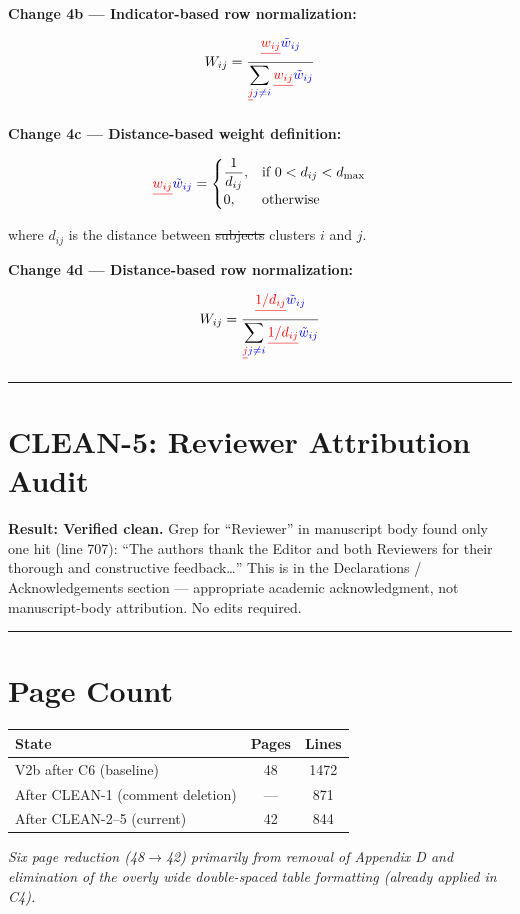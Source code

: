 \documentclass[11pt]{article}
\newcommand{\DEL}[1]{{\color{red}\sout{#1}}}
\newcommand{\ADD}[1]{{\color{blue}#1}}
\begin{document}
\medskip
\textbf{Change 4b --- Indicator-based row normalization:}

\cbstart
\[
  W_{ij} = \frac{\DEL{w_{ij}} \ADD{\tilde{w}_{ij}}}
                {\displaystyle\sum_{\DEL{j} \ADD{j \neq i}} \DEL{w_{ij}} \ADD{\tilde{w}_{ij}}}
\]
\cbend

\medskip
\textbf{Change 4c --- Distance-based weight definition:}

\cbstart
\[
  \DEL{w_{ij}} \ADD{\tilde{w}_{ij}} =
  \begin{cases}
    \dfrac{1}{d_{ij}}, & \text{if } 0 < d_{ij} < d_{\max}\\[4pt]
    0, & \text{otherwise}
  \end{cases}
\]
\cbend

\quad where $d_{ij}$ is the distance between \DEL{subjects} \ADD{clusters} $i$ and $j$.

\medskip
\textbf{Change 4d --- Distance-based row normalization:}

\cbstart
\[
  W_{ij} = \frac{\DEL{1/d_{ij}} \ADD{\tilde{w}_{ij}}}
                {\displaystyle\sum_{\DEL{j} \ADD{j \neq i}} \DEL{1/d_{ij}} \ADD{\tilde{w}_{ij}}}
\]
\cbend

\bigskip
\hrule
\bigskip

\section*{CLEAN-5: Reviewer Attribution Audit}

\textbf{Result: Verified clean.} Grep for ``Reviewer'' in manuscript body found only one
hit (line 707): ``The authors thank the Editor and both Reviewers for their thorough and
constructive feedback\ldots'' This is in the Declarations / Acknowledgements section ---
appropriate academic acknowledgment, not manuscript-body attribution. No edits required.

\bigskip
\hrule

\section*{Page Count}

\begin{center}
\begin{tabular}{lcc}
\toprule
State & Pages & Lines \\
\midrule
V2b after C6 (baseline) & 48 & 1472 \\
After CLEAN-1 (comment deletion) & --- & 871 \\
After CLEAN-2--5 (current) & 42 & 844 \\
\bottomrule
\end{tabular}
\end{center}

\noindent \textit{Six page reduction (48$\to$42) primarily from removal of Appendix D and
elimination of the overly wide double-spaced table formatting (already applied in C4).}
\end{document}

